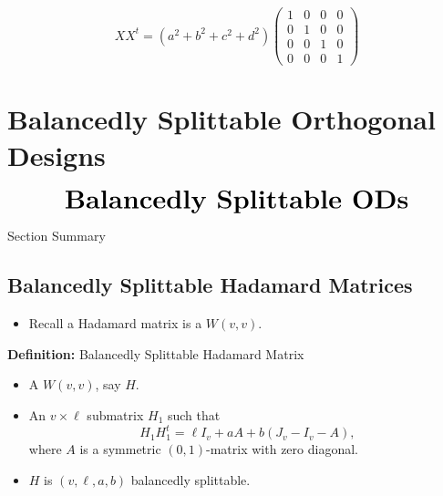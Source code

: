 \documentclass{beamer}
\begin{document}
\begin{frame}

  \[
    XX^t = (a^2+b^2+c^2+d^2)
    \begin{pmatrix}
      1 & 0 & 0 & 0 \\
      0 & 1 & 0 & 0 \\
      0 & 0 & 1 & 0 \\
      0 & 0 & 0 & 1
    \end{pmatrix}
  \]
  
\end{frame}


\section{Balancedly Splittable Orthogonal Designs}

\begin{frame}
  \[
    \text{\huge\bf Balancedly Splittable ODs}
  \]
\end{frame}

\begin{frame}{Section Summary}
  \tableofcontents[sections={2}]
\end{frame}


\subsection{Balancedly Splittable Hadamard Matrices}

\begin{frame}

  \begin{itemize}
  \item Recall a Hadamard matrix is a $W(v,v)$.
  \end{itemize}

  \begin{block}{{\bf Definition:} Balancedly Splittable Hadamard Matrix \cite[][]{splittable-hadamard}}
    \begin{itemize}
    \item A $W(v,v)$, say $H$.
    \item An $v \times \ell$ submatrix $H_1$ such that
      \[
        H_1H_1^t = \ell I_v + aA + b(J_v-I_v-A),
      \]
      where $A$ is a symmetric $(0,1)$-matrix with zero diagonal.
    \item $H$ is $(v,\ell,a,b)$ balancedly splittable.
    \end{itemize}
  \end{block}
  
\end{frame}
\end{document}
